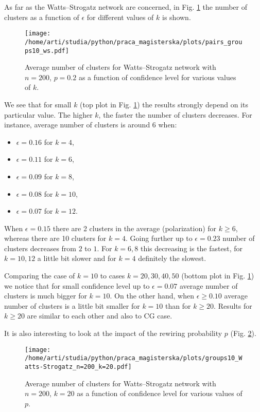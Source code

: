 \documentclass[a4paper, 12pt]{article}
\begin{document}
\indent

As far as the Watts--Strogatz network are concerned, in Fig. \ref{f27} the number of clusters as a function of $\epsilon$ for different values of $k$ is shown.

\begin{figure}[H]
		\centering
		\texttt{[image: /home/arti/studia/python/praca\_magisterska/plots/pairs\_groups10\_ws.pdf]}
		\caption{Average number of clusters for Watts--Strogatz network with $n=200$, $p=0.2$ as a function of confidence level for various values of $k$.}
		\label{f27}
\end{figure}

We see that for small $k$ (top plot in Fig. \ref{f27}) the results strongly depend on its particular value. The higher $k$, the faster the number of clusters decreases. For instance, average number of clusters is around $6$ when:

\begin{itemize}
\item $\epsilon=0.16$ for $k=4$,
\item $\epsilon=0.11$ for $k=6$,
\item $\epsilon=0.09$ for $k=8$,
\item $\epsilon=0.08$ for $k=10$,
\item $\epsilon=0.07$ for $k=12$.
\end{itemize}

When $\epsilon=0.15$ there are 2 clusters in the average (polarization) for $k \geq 6$, whereas there are 10 clusters for $k=4$. Going further up to $\epsilon=0.23$ number of clusters decreases from $2$ to $1$. For $k=6,8$ this decreasing is the fastest, for $k=10,12$ a little bit slower and for $k=4$ definitely the slowest.

\indent
Comparing the case of $k=10$ to cases $k=20,30,40,50$ (bottom plot in Fig. \ref{f27}) we notice that for small confidence level up to $\epsilon=0.07$ average number of clusters is much bigger for $k=10$. On the other hand, when $\epsilon \geq 0.10$ average number of clusters is a little bit smaller for $k=10$ than for $k \geq 20$. Results for $k \geq 20$ are similar to each other and also to CG case.

\indent

It is also interesting to look at the impact of the rewiring probability $p$ (Fig. \ref{f28}).

\begin{figure}[H]
		\centering
		\texttt{[image: /home/arti/studia/python/praca\_magisterska/plots/groups10\_Watts-Strogatz\_n=200\_k=20.pdf]}
		\caption{Average number of clusters for Watts--Strogatz network with $n=200$, $k=20$ as a function of confidence level for various values of $p$.}
		\label{f28}
\end{figure}
\end{document}
